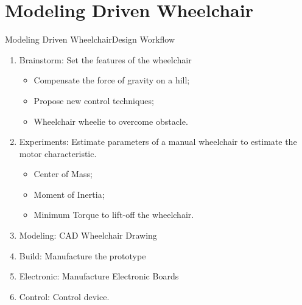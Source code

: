\documentclass[10pt]{beamer}
\begin{document}
\section{Modeling Driven Wheelchair}
\begin{frame}{Modeling Driven Wheelchair}{Design Workflow}
\begin{enumerate}
	\item<1-> Brainstorm: Set the features of the wheelchair
	\begin{itemize}
		\item<1-> Compensate the force of gravity on a hill;
		\item<1-> Propose new control techniques;
		\item<1-> Wheelchair wheelie to overcome obstacle.
	\end{itemize}
	\item<2-> Experiments: Estimate parameters of a manual wheelchair to estimate the motor characteristic.
	\begin{itemize}[<+->]
		\item<2-> Center of Mass;
		\item<2-> Moment of Inertia;
		\item<2-> Minimum Torque to lift-off the wheelchair.
	\end{itemize}
	\item<3-> Modeling: CAD Wheelchair Drawing
	\item<4-> Build: Manufacture the prototype
	\item<5-> Electronic: Manufacture Electronic Boards
	\item<6-> Control: Control device.
\end{enumerate}

\end{frame}
\end{document}

